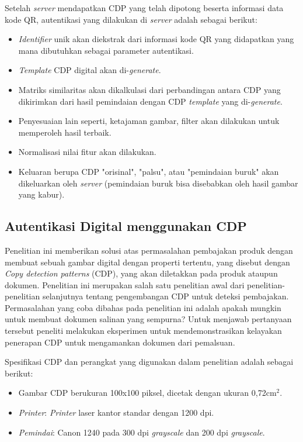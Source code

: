 \noindent Setelah \emph{server} mendapatkan CDP yang telah dipotong beserta informasi data kode QR, autentikasi yang dilakukan di \emph{server} adalah sebagai berikut:

\begin{itemize}
	\item \emph{Identifier} unik akan diekstrak dari informasi kode QR yang didapatkan yang mana dibutuhkan sebagai parameter autentikasi.
	\item \emph{Template} CDP digital akan di-\emph{generate}.
	\item Matriks similaritas akan dikalkulasi dari perbandingan antara CDP yang dikirimkan dari hasil pemindaian dengan CDP \emph{template} yang di-\emph{generate}.
	\item Penyesuaian lain seperti, ketajaman gambar, filter akan dilakukan untuk memperoleh hasil terbaik.
	\item Normalisasi nilai fitur akan dilakukan.
	\item Keluaran berupa CDP "orisinal", "palsu", atau "pemindaian buruk" akan dikeluarkan oleh \emph{server} (pemindaian buruk bisa disebabkan oleh hasil gambar yang
	      kabur).
\end{itemize}

\subsection{Autentikasi Digital menggunakan CDP}
Penelitian ini memberikan solusi atas permasalahan pembajakan produk dengan membuat sebuah gambar digital dengan properti tertentu, yang disebut dengan
\emph{Copy detection patterns} (CDP), yang akan diletakkan pada produk ataupun dokumen. Penelitian ini merupakan salah satu penelitian awal dari
penelitian-penelitian selanjutnya tentang pengembangan CDP untuk deteksi pembajakan. Permasalahan yang coba dibahas pada penelitian ini adalah apakah mungkin
untuk membuat dokumen salinan yang sempurna? Untuk menjawab pertanyaan tersebut peneliti melakukan eksperimen untuk mendemonstrasikan kelayakan penerapan CDP
untuk mengamankan dokumen dari pemalsuan. \cite{picard2004digital}

\noindent Spesifikasi CDP dan perangkat yang digunakan dalam penelitian adalah sebagai berikut:
\begin{itemize}
	\item Gambar CDP berukuran 100x100 piksel, dicetak dengan ukuran 0,72cm$^2$.
	\item \emph{Printer}: \emph{Printer} laser kantor standar dengan 1200 dpi.
	\item \emph{Pemindai}: Canon 1240 pada 300 dpi \emph{grayscale} dan 200 dpi \emph{grayscale}.
\end{itemize}

